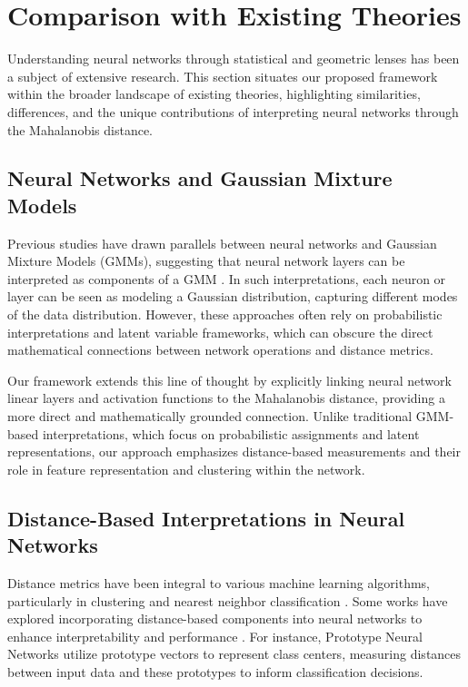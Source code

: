 
\section{Comparison with Existing Theories}
\label{sec:comparison}

Understanding neural networks through statistical and geometric lenses has been a subject of extensive research. This section situates our proposed framework within the broader landscape of existing theories, highlighting similarities, differences, and the unique contributions of interpreting neural networks through the Mahalanobis distance.

\subsection{Neural Networks and Gaussian Mixture Models}

Previous studies have drawn parallels between neural networks and Gaussian Mixture Models (GMMs), suggesting that neural network layers can be interpreted as components of a GMM \citep{nguyen2011deep, van2008gaussian}. In such interpretations, each neuron or layer can be seen as modeling a Gaussian distribution, capturing different modes of the data distribution. However, these approaches often rely on probabilistic interpretations and latent variable frameworks, which can obscure the direct mathematical connections between network operations and distance metrics.

Our framework extends this line of thought by explicitly linking neural network linear layers and activation functions to the Mahalanobis distance, providing a more direct and mathematically grounded connection. Unlike traditional GMM-based interpretations, which focus on probabilistic assignments and latent representations, our approach emphasizes distance-based measurements and their role in feature representation and clustering within the network.

\subsection{Distance-Based Interpretations in Neural Networks}

Distance metrics have been integral to various machine learning algorithms, particularly in clustering and nearest neighbor classification \citep{hastie2009elements}. Some works have explored incorporating distance-based components into neural networks to enhance interpretability and performance \citep{hullermeier2013learning}. For instance, Prototype Neural Networks \citep{kim2016interpretability} utilize prototype vectors to represent class centers, measuring distances between input data and these prototypes to inform classification decisions.

